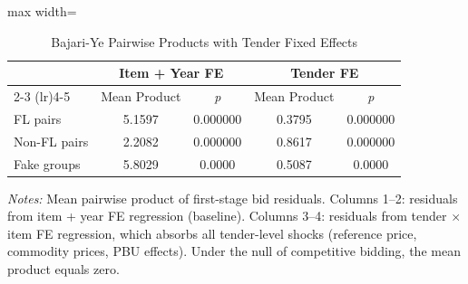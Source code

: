 \begin{table}[htbp]
\centering
\caption{Bajari-Ye Pairwise Products with Tender Fixed Effects}
\label{tab:bajari_ye_tender_fe}
\begin{adjustbox}{max width=\textwidth}
\begin{threeparttable}
\small
\begin{tabular}{lcccc}
\toprule
 & \multicolumn{2}{c}{Item + Year FE} & \multicolumn{2}{c}{Tender FE} \\
\cmidrule(lr){2-3} \cmidrule(lr){4-5}
 & Mean Product & \textit{p} & Mean Product & \textit{p} \\
\midrule
FL pairs & 5.1597 & 0.000000 & 0.3795 & 0.000000 \\
Non-FL pairs & 2.2082 & 0.000000 & 0.8617 & 0.000000 \\
Fake groups & 5.8029 & 0.0000 & 0.5087 & 0.0000 \\
\bottomrule
\end{tabular}
\begin{tablenotes}
\small
\item \textit{Notes:} Mean pairwise product of first-stage bid residuals.
Columns 1--2: residuals from item + year FE regression (baseline).
Columns 3--4: residuals from tender $\times$ item FE regression, which absorbs all
tender-level shocks (reference price, commodity prices, PBU effects).
Under the null of competitive bidding, the mean product equals zero.
\end{tablenotes}
\end{threeparttable}
\end{adjustbox}
\end{table}
